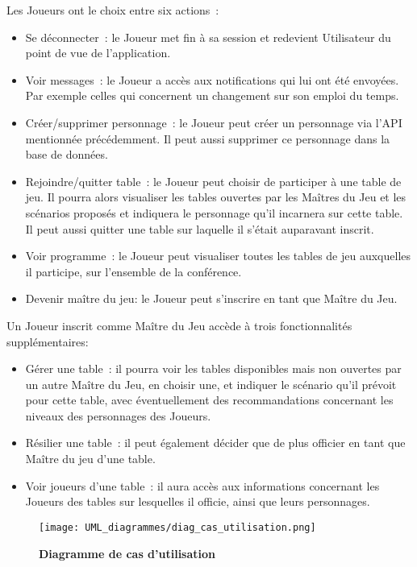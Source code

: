 \documentclass[11pt]{article}
\begin{document}
Les Joueurs ont le choix entre six actions~:
\begin{itemize}
    \item {Se déconnecter~: le Joueur met fin à sa session et redevient Utilisateur du point de vue de l'application.}
    \item{Voir messages~: le Joueur a accès aux notifications qui lui ont été envoyées. Par exemple celles qui concernent un changement sur son emploi du temps.}
    \item{Créer/supprimer personnage~: le Joueur peut créer un personnage via l'API mentionnée précédemment. Il peut aussi supprimer ce personnage dans la base de données.}
    \item{Rejoindre/quitter table~: le Joueur peut choisir de participer à une table de jeu. Il pourra alors visualiser les tables ouvertes par les Maîtres du Jeu et les scénarios proposés et indiquera le personnage qu'il incarnera sur cette table. Il peut aussi quitter une table sur laquelle il s'était auparavant inscrit.}
    \item{Voir programme~: le Joueur peut visualiser toutes les tables de jeu auxquelles il participe, sur l'ensemble de la conférence.}
    \item{Devenir maître du jeu: le Joueur peut s'inscrire en tant que Maître du Jeu.\\}
\end{itemize}

Un Joueur inscrit comme Maître du Jeu accède à trois fonctionnalités supplémentaires:
\begin{itemize}
    \item{Gérer une table~: il pourra voir les tables disponibles mais non ouvertes par un autre Maître du Jeu, en choisir une, et indiquer le scénario qu'il prévoit pour cette table, avec éventuellement des recommandations concernant les niveaux des personnages des Joueurs.}
    \item{Résilier une table~: il peut également décider que de plus officier en tant que Maître du jeu d'une table.}
    \item{Voir joueurs d'une table~: il aura accès aux informations concernant les Joueurs des tables sur lesquelles il officie, ainsi que leurs personnages.\\}
\end{itemize}

\begin{figure}[H]
    \caption{\textbf{Diagramme de cas d'utilisation}}
    \label{UML_classe_pipeline}
    \centering
    \texttt{[image: UML\_diagrammes/diag\_cas\_utilisation.png]}
\end{figure}
\end{document}
